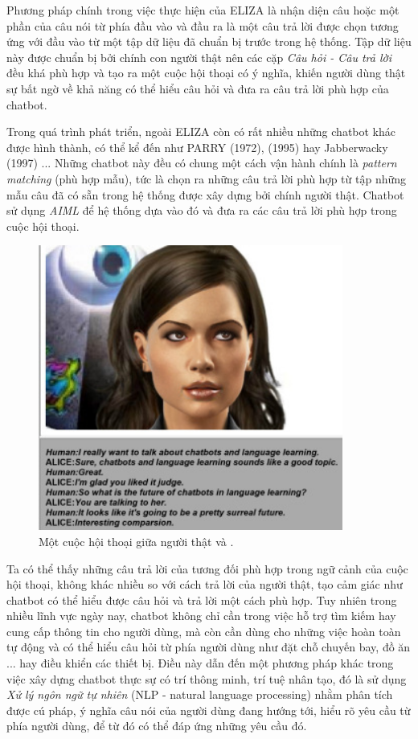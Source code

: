 \documentclass[12pt]{report}
\begin{document}
Phương pháp chính trong việc thực hiện của ELIZA là nhận diện câu hoặc một phần của câu nói từ phía đầu vào và đầu ra là một câu trả lời được chọn tương ứng với đầu vào từ một tập dữ liệu đã chuẩn bị trước trong hệ thống. Tập dữ liệu này được chuẩn bị bởi chính con người thật nên các cặp \textit{Câu hỏi - Câu trả lời} đều khá phù hợp và tạo ra một cuộc hội thoại có ý nghĩa, khiến người dùng thật sự bất ngờ về khả năng có thể hiểu câu hỏi và đưa ra câu trả lời phù hợp của chatbot.

Trong quá trình phát triển, ngoài ELIZA còn có rất nhiều những chatbot khác được hình thành, có thể kể đến như PARRY (1972), \alice{} (1995) hay Jabberwacky (1997) ... Những chatbot này đều có chung một cách vận hành chính là \textit{pattern matching} (phù hợp mẫu), tức là chọn ra những câu trả lời phù hợp từ tập những mẫu câu đã có sẵn trong hệ thống được xây dựng bởi chính người thật. Chatbot \alice{} sử dụng \textit{AIML} để hệ thống dựa vào đó và đưa ra các câu trả lời phù hợp trong cuộc hội thoại.

\begin{figure}[H]
  \centering
    \includegraphics[width=10cm]{Pics/Chap1/alice.jpg}
  \caption{Một cuộc hội thoại giữa người thật và \alice{}\cite{alice-chatbot}.}
\end{figure}

Ta có thể thấy những câu trả lời của \alice{} tương đối phù hợp trong ngữ cảnh của cuộc hội thoại, không khác nhiều so với cách trả lời của người thật, tạo cảm giác như chatbot có thể hiểu được câu hỏi và trả lời một cách phù hợp. Tuy nhiên trong nhiều lĩnh vực ngày nay, chatbot không chỉ cần trong việc hỗ trợ tìm kiếm hay cung cấp thông tin cho người dùng, mà còn cần dùng cho những việc hoàn toàn tự động và có thể hiểu câu hỏi từ phía người dùng như đặt chỗ chuyến bay, đồ ăn ... hay điều khiển các thiết bị. Điều này dẫn đến một phương pháp khác trong việc xây dựng chatbot thực sự có trí thông minh, trí tuệ nhân tạo, đó là sử dụng \textit{Xử lý ngôn ngữ tự nhiên} (NLP - natural language processing) nhằm phân tích được cú pháp, ý nghĩa câu nói của người dùng đang hướng tới, hiểu rõ yêu cầu từ phía người dùng, để từ đó có thể đáp ứng những yêu cầu đó.
\end{document}
